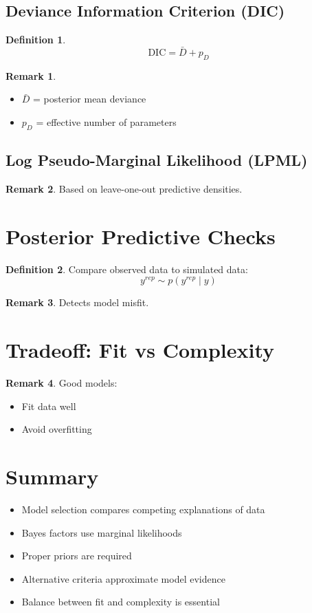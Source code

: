 \documentclass[12pt,oneside]{book}
\numberwithin{equation}{section}
\theoremstyle{definition}
\newtheorem{definition}{Definition}[section]
\newtheorem{remark}{Remark}[section]
\theoremstyle{plain}
\theoremstyle{remark}
\begin{document}
\subsection{Deviance Information Criterion (DIC)}

\begin{definition}
$$
\text{DIC} = \bar{D} + p_D
$$
\end{definition}

\begin{remark}
\begin{itemize}
\item $\bar{D}$ = posterior mean deviance
\item $p_D$ = effective number of parameters
\end{itemize}
\end{remark}

\subsection{Log Pseudo-Marginal Likelihood (LPML)}

\begin{remark}
Based on leave-one-out predictive densities.
\end{remark}

\section{Posterior Predictive Checks}

\begin{definition}
Compare observed data to simulated data:
$$
y^{rep} \sim p(y^{rep} \mid y)
$$
\end{definition}

\begin{remark}
Detects model misfit.
\end{remark}

\section{Tradeoff: Fit vs Complexity}

\begin{remark}
Good models:
\begin{itemize}
\item Fit data well
\item Avoid overfitting
\end{itemize}
\end{remark}

\section{Summary}

\begin{itemize}
\item Model selection compares competing explanations of data
\item Bayes factors use marginal likelihoods
\item Proper priors are required
\item Alternative criteria approximate model evidence
\item Balance between fit and complexity is essential
\end{itemize}
\end{document}
